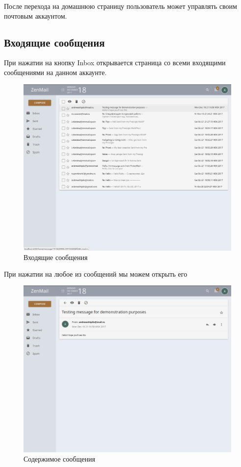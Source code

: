 \documentclass{article}
\begin{document}
После перехода на домашнюю страницу пользователь может управлять своим почтовым аккаунтом. \\

\subsection{Входящие сообщения}
При нажатии на кнопку Inbox открывается страница со всеми входящими сообщениями на данном аккаунте.

\begin{figure}[H]
        \begin{flushleft}
            \centerline{\includegraphics[scale=0.6]{inbox.png}}
            \caption{Входящие сообщения}
        \end{flushleft}
\end{figure}

При нажатии на любое из сообщений мы можем открыть его 

\begin{figure}[H]
        \begin{flushleft}
            \centerline{\includegraphics[scale=0.6]{message.png}}
        \caption{Содержимое сообщения}
        \end{flushleft}
\end{figure}
\end{document}
